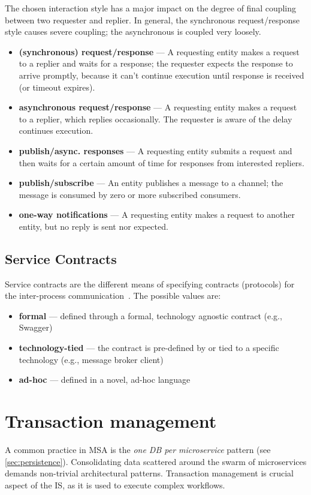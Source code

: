 \documentclass[thesis=M,english,hidelinks]{FITthesis}[2012/10/20]
\begin{document}
The chosen interaction style has a major impact on the degree of final coupling between two requester and replier. In general, the synchronous request/response style causes severe coupling; the asynchronous is coupled very loosely.
\begin{itemize}
    \item \textbf{(synchronous) request/response} --- A requesting entity makes a request to a replier and waits for a response; the requester expects the response to arrive promptly, because it can't continue execution until response is received (or timeout expires).
    \item \textbf{asynchronous request/response} --- A requesting entity makes a request to a replier, which replies occasionally. The requester is aware of the delay continues execution.
    \item \textbf{publish/async. responses} --- A requesting entity submits a request and then waits for a certain amount of time for responses from interested repliers.
    \item \textbf{publish/subscribe} --- An entity publishes a message to a channel; the message is consumed by zero or more subscribed consumers.
    \item \textbf{one-way notifications} --- A requesting entity makes a request to another entity, but no reply is sent nor expected.
\end{itemize}

\subsection{Service Contracts}
Service contracts are the different means of specifying contracts (protocols) for the inter-process communication~\cite{ms-today-tomorrow}. The possible values are:

\begin{itemize}
    \item \textbf{formal} --- defined through a formal, technology agnostic contract (e.g., Swagger)
    \item \textbf{technology-tied} --- the contract is pre-defined by or tied to a specific technology (e.g., message broker client)
    \item \textbf{ad-hoc} --- defined in a novel, ad-hoc language
\end{itemize}

% 
% 
\section{Transaction management}
\label{sec:transaction_management}
A common practice in \acrshort{MSA} is the \textit{one \acrshort{DB} per microservice} pattern (see \ref{sec:persistence}). Consolidating data scattered around the swarm of microservices demands non-trivial architectural patterns. Transaction management is crucial aspect of the \acrshort{IS}, as it is used to execute complex workflows.
\end{document}
